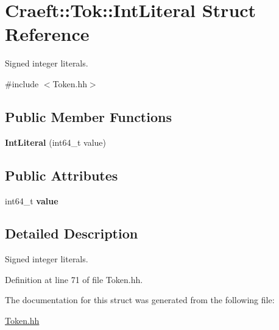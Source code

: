 \hypertarget{struct_craeft_1_1_tok_1_1_int_literal}{}\section{Craeft\+:\+:Tok\+:\+:Int\+Literal Struct Reference}
\label{struct_craeft_1_1_tok_1_1_int_literal}


Signed integer literals.  




{\ttfamily \#include $<$Token.\+hh$>$}

\subsection*{Public Member Functions}
\begin{DoxyCompactItemize}
\item 
\hypertarget{struct_craeft_1_1_tok_1_1_int_literal_a0ea408d10dabcb273e10a0b48a9bbf63}{}\label{struct_craeft_1_1_tok_1_1_int_literal_a0ea408d10dabcb273e10a0b48a9bbf63} 
{\bfseries Int\+Literal} (int64\+\_\+t value)
\end{DoxyCompactItemize}
\subsection*{Public Attributes}
\begin{DoxyCompactItemize}
\item 
\hypertarget{struct_craeft_1_1_tok_1_1_int_literal_ab113edf4246f583fba2cc0f1551cb5a0}{}\label{struct_craeft_1_1_tok_1_1_int_literal_ab113edf4246f583fba2cc0f1551cb5a0} 
int64\+\_\+t {\bfseries value}
\end{DoxyCompactItemize}


\subsection{Detailed Description}
Signed integer literals. 

Definition at line 71 of file Token.\+hh.



The documentation for this struct was generated from the following file\+:\begin{DoxyCompactItemize}
\item 
\hyperlink{_token_8hh}{Token.\+hh}\end{DoxyCompactItemize}
